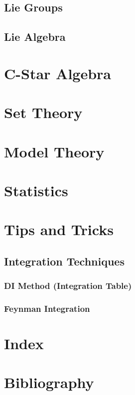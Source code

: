 \documentclass[12pt, english]{book}
\begin{document}
	\chapter{Lie Groups}
	
	\chapter{Lie Algebra}
	
	\part{C-Star Algebra} \label{C-Star Algebra Part}
	
	\part{Set Theory} \label{Set Theory Part}
	
	\part{Model Theory} \label{Model Theory Part}
	
	\part{Statistics} \label{Statistics Part}
	\part{Tips and Tricks} \label{Tips and Tricks Part}
	
	\chapter{Integration Techniques} \label{Integration Techniques Chapter - Tips and Tricks}
	
	\section{DI Method (Integration Table)} \label{DI Method Section - Tips and Tricks}
	
	\section{Feynman Integration} \label{Feynman Integration Section - Tips and Tricks}
	
	\backmatter
	\part{Index} \label{Index Part}
	
	\part{Bibliography}
	
	\typeout{}
	
	
\end{document}
